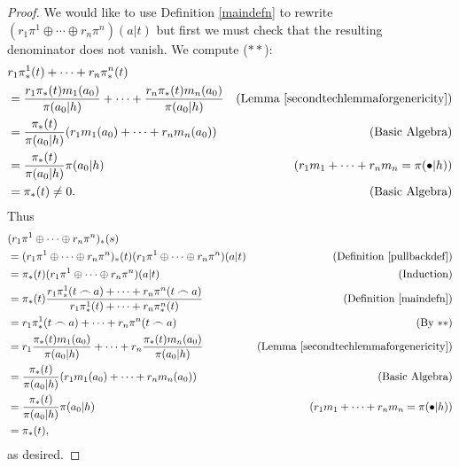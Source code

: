 \documentclass[runningheads]{llncs}
\begin{document}
\begin{proof}
    We would like to use Definition \ref{maindefn} to rewrite
    $(r_1\pi^1\oplus\cdots\oplus r_n\pi^n)(a|t)$ but first we must
    check that the resulting denominator does not vanish. We compute ($**$):
    \begin{align*}
        &{} r_1\pi^1_*(t) + \cdots + r_n\pi^n_*(t)\\
            &= \frac{r_1\pi_*(t)m_1(a_0)}{\pi(a_0|h)}
                + \cdots +
                \frac{r_n\pi_*(t)m_n(a_0)}{\pi(a_0|h)}
                    &\mbox{(Lemma \ref{secondtechlemmaforgenericity})}\\
            &= \frac{\pi_*(t)}{\pi(a_0|h)}
                (r_1m_1(a_0) + \cdots + r_nm_n(a_0))
                    &\mbox{(Basic Algebra)}\\
            &= \frac{\pi_*(t)}{\pi(a_0|h)}\pi(a_0|h)
                    &\mbox{($r_1m_1+\cdots+r_nm_n=\pi(\bullet|h)$)}\\
            &= \pi_*(t)\not=0.
                    &\mbox{(Basic Algebra)}
    \end{align*}
    Thus
    \begin{align*}
        &{} (r_1\pi^1\oplus\cdots\oplus r_n\pi^n)_*(s)\\
            &= (r_1\pi^1\oplus\cdots\oplus r_n\pi^n)_*(t)
                (r_1\pi^1\oplus\cdots\oplus r_n\pi^n)(a|t)
                    &\mbox{(Definition \ref{pullbackdef})}\\
            &= \pi_*(t)(r_1\pi^1\oplus\cdots\oplus r_n\pi^n)(a|t)
                    &\mbox{(Induction)}\\
            &= \pi_*(t)\frac{r_1\pi^1_*(t\frown a)+\cdots+r_n\pi^n(t\frown a)}
                {r_1\pi^1_*(t)+\cdots+r_n\pi^n_*(t)}
                    &\mbox{(Definition \ref{maindefn})}\\
            &= r_1\pi^1_*(t\frown a)+\cdots+r_n\pi^n(t\frown a)
                    &\mbox{(By $**$)}\\
            &= r_1\frac{\pi_*(t)m_1(a_0)}{\pi(a_0|h)}
                +\cdots+r_n\frac{\pi_*(t)m_n(a_0)}{\pi(a_0|h)}
                    &\mbox{(Lemma \ref{secondtechlemmaforgenericity})}\\
            &= \frac{\pi_*(t)}{\pi(a_0|h)}(r_1m_1(a_0)+\cdots+r_nm_n(a_0))
                    &\mbox{(Basic Algebra)}\\
            &= \frac{\pi_*(t)}{\pi(a_0|h)}\pi(a_0|h)
                    &\mbox{($r_1m_1+\cdots+r_nm_n=\pi(\bullet|h)$)}\\
            &= \pi_*(t),
    \end{align*}
    as desired.


\end{proof}
\end{document}
